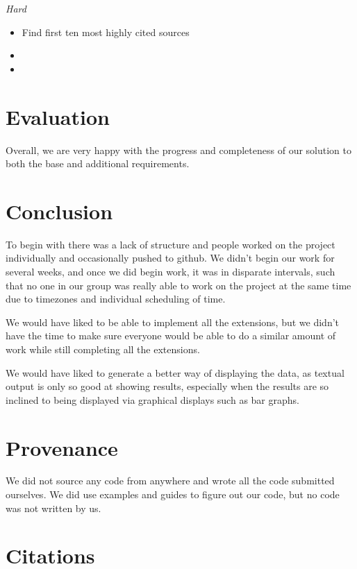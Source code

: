 \documentclass[12pt,a4paper,final]{article}
\begin{document}
\begin{center} \emph{Hard} \end{center}
\begin{itemize}[noitemsep]
    \item Find first ten most highly cited sources
    \item
    \item
\end{itemize}

\section*{Evaluation}

Overall, we are very happy with the progress and completeness of our solution to both the base and additional requirements.

\section*{Conclusion}

To begin with there was a lack of structure and people worked on the project individually and occasionally pushed to github. We didn't begin our work for several weeks, and once we did begin work, it was in disparate intervals, such that no one in our group was really able to work on the project at the same time due to timezones and individual scheduling of time.

We would have liked to be able to implement all the extensions, but we didn't have the time to make sure everyone would be able to do a similar amount of work while still completing all the extensions.

We would have liked to generate a better way of displaying the data, as textual output is only so good at showing results, especially when the results are so inclined to being displayed via graphical displays such as bar graphs.

\section*{Provenance}

We did not source any code from anywhere and wrote all the code submitted ourselves. We did use examples and guides to figure out our code, but no code was not written by us.

\section*{Citations}
\end{document}
